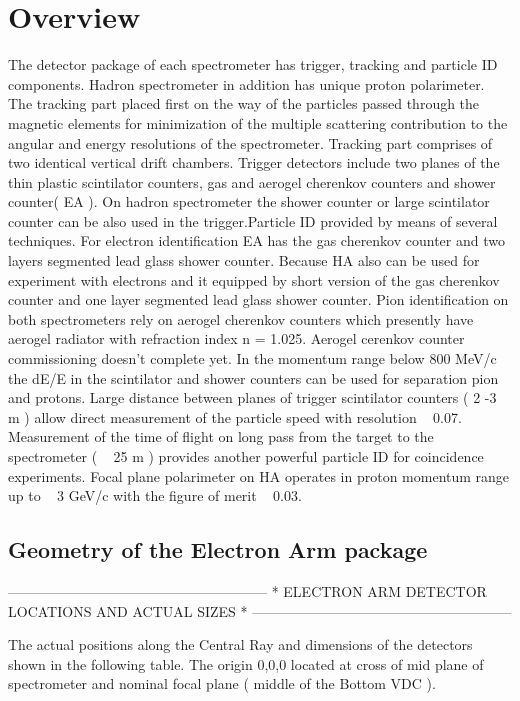 
\section{Overview}

        The detector package of each spectrometer has trigger, tracking and particle 
ID components. Hadron spectrometer in addition has unique proton polarimeter. The 
tracking part placed first on the way of the particles passed through the magnetic 
elements for minimization of the multiple scattering contribution to the angular and 
energy resolutions of the spectrometer. Tracking part comprises of 
two identical vertical drift chambers. Trigger detectors include two planes of the
thin plastic scintilator counters, gas and aerogel cherenkov counters and shower 
counter( EA ). On hadron spectrometer the shower counter or large scintilator counter 
can be also used in the trigger.Particle ID provided by means of several techniques. 
For electron identification EA has the gas cherenkov counter and two layers segmented 
lead glass shower counter. Because HA also can be used for experiment with electrons 
and it equipped by short version of the gas cherenkov counter and one layer segmented 
lead glass shower counter. Pion identification on both spectrometers rely on aerogel 
cherenkov counters which presently have aerogel radiator with refraction index n = 1.025. 
Aerogel cerenkov counter commissioning doesn't complete yet. In the momentum range 
below 800 MeV/c the dE/E in the scintilator and shower counters can be used for 
separation pion and protons. Large distance between planes of trigger scintilator 
counters ( 2 -3 m ) allow direct measurement of the particle speed with resolution 
~ 0.07. Measurement of the time of flight on long pass from the target to the 
spectrometer ( ~ 25 m ) provides another powerful particle ID for coincidence experiments.
Focal plane polarimeter on HA operates in proton momentum range up to ~ 3 GeV/c with 
the figure of merit ~ 0.03.

\subsection{Geometry of the Electron Arm package}

          --------------------------------------------------------
          *   ELECTRON ARM DETECTOR LOCATIONS AND ACTUAL SIZES   *
          --------------------------------------------------------

The actual positions along the Central Ray and dimensions of the detectors shown in 
the following table. The origin 0,0,0 located at cross of mid plane of spectrometer 
and nominal focal plane ( middle of the Bottom VDC ).

